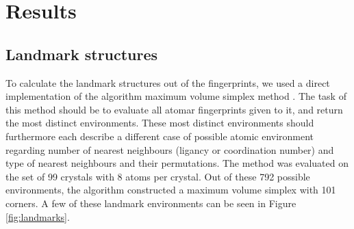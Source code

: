 \newpage
\section{Results}
\subsection{Landmark structures}

To calculate the landmark structures out of the fingerprints, we used a direct implementation of the algorithm maximum volume simplex method \cite{Behnam2020}. The task of this method should be to evaluate all atomar fingerprints given to it, and return the most distinct environments. These most distinct environments should furthermore each describe a different case of possible atomic environment regarding number of nearest neighbours (ligancy or coordination number) and type of nearest neighbours and their permutations. The method was evaluated on the set of 99 crystals with 8 atoms per crystal. Out of these 792 possible environments, the algorithm constructed a maximum volume simplex with 101 corners. A few of these landmark environments can be seen in Figure \ref{fig:landmarks}.

